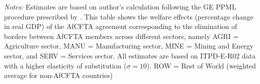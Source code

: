 \vspace{-2.3756cm}

\begin{flushleft}
	\begin{minipage}{1.05\textwidth}
		\scriptsize
		\justifying
		\noindent \textit{Notes:} Estimates are based on author's calculation following the GE PPML procedure prescribed by \citet{anderson2018geppml}. This table shows the welfare effects (percentage change in real GDP) of the AfCFTA agreement corresponding to the elimination of borders between AfCFTA members across different sectors, namely AGRI = Agriculture sector, MANU = Manufacturing sector, MINE = Mining and Energy sector, and SERV = Services sector. All estimates are based on ITPD-E-R02 data with a higher elasticity of substitution ($\sigma = 10$). ROW = Rest of World (weighted average for non-AfCFTA countries)
	\end{minipage}
\end{flushleft}
